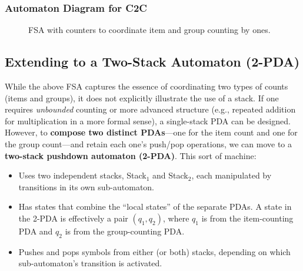 \documentclass[11pt]{article}
\begin{document}
\subsubsection*{Automaton Diagram for C2C}

\begin{figure}[H]
\centering
{}
\caption{FSA with counters to coordinate item and group counting by ones.}
\end{figure}

\subsection*{Extending to a Two-Stack Automaton (2-PDA)}

While the above FSA captures the essence of coordinating two types of counts (items and groups), it does not explicitly illustrate the use of a stack. If one requires \textit{unbounded} counting or more advanced structure (e.g., repeated addition for multiplication in a more formal sense), a single-stack PDA can be designed. However, to \textbf{compose two distinct PDAs}—one for the item count and one for the group count—and retain each one’s push/pop operations, we can move to a \textbf{two-stack pushdown automaton (2-PDA)}. This sort of machine:

\begin{itemize}
    \item Uses two independent stacks, Stack$_1$ and Stack$_2$, each manipulated by transitions in its own sub-automaton.
    \item Has states that combine the “local states” of the separate PDAs. A state in the 2-PDA is effectively a pair \((q_1, q_2)\), where \(q_1\) is from the item-counting PDA and \(q_2\) is from the group-counting PDA.
    \item Pushes and pops symbols from either (or both) stacks, depending on which sub-automaton’s transition is activated.
\end{itemize}
\end{document}
